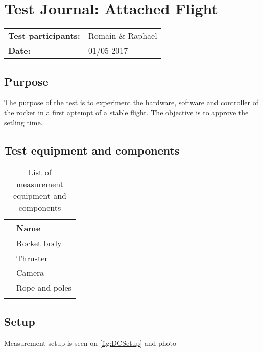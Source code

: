 \graphicspath{{figures/design/}}


			\chapter{Test Journal: Attached Flight}



\begin{table}[!h]
\begin{tabular}{l l}
\textbf{Test participants:} & Romain \& Raphael   \\
\textbf{Date:}  & 01/05-2017
\end{tabular}
\end{table}


	\section*{Purpose}
	
The purpose of the test is to experiment the hardware, software and controller of the rocker in a first aptempt of a stable flight. The objective is to approve the setling time.




	\section*{Test equipment and components}
	
\begin{table}[htbp]
	\centering
	\caption{List of measurement equipment and components}
	\label{tab_appendix:FlightEquip}
	\begin{tabularx}{\textwidth}{lX}
		 & Name \\ \toprule
		 & Rocket body \\
		 & Thruster \\ \rowcolor{lightGrey}
		 & Camera \\
		 & Rope and poles \\ \rowcolor{lightGrey}
	\end{tabularx}
\end{table}




	\section*{Setup}
	
Measurement setup is seen on \autoref{fig:DCSetup} and photo \


